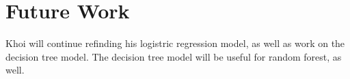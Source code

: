 \section{Future Work}

Khoi will continue refinding his logistric regression model, as well as work on the decision tree model. The decision tree model will be useful for random forest, as well.
